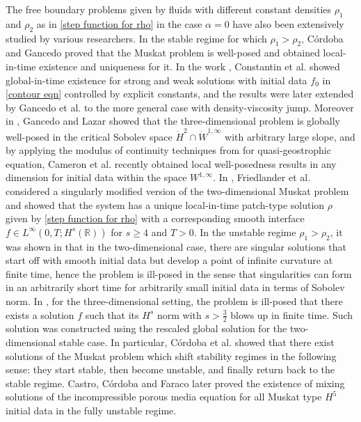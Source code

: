 \documentclass[reqno]{amsart}%
\theoremstyle{definition}
\theoremstyle{remark}
\numberwithin{equation}{section}
\newcommand{\0}{\mathbf{0}}
\newcommand{\1}{\mathbf{1}}
\newcommand{\R}{\mathbb R}
\numberwithin{equation}{section}
\numberwithin{theorem}{section}
\numberwithin{figure}{section}
\begin{document}
The free boundary problems given by fluids with different constant densities $\rho_1$ and $\rho_2$ as in \eqref{step function for rho} in the case $\alpha  = 0$ have also been extensively studied by various researchers. In the stable regime for which $\rho_1>\rho_2$, C\'ordoba and Gancedo \cite{CG07, cordoba2009maximum} proved that the Muskat problem is well-posed and obtained local-in-time existence and uniqueness for it. In the work \cite{constantin2016muskat}, Constantin et al. showed global-in-time existence for strong and weak solutions with initial data $f_0$ in \eqref{contour eqn} controlled by explicit constants, and the results were later extended by Gancedo et al. \cite{GGPS19} to the more general case with density-viscosity jump. Moreover in \cite{GL22}, Gancedo and Lazar showed that the three-dimensional problem is globally well-posed in the critical Sobolev space $\dot{H}^2\cap\dot{W}^{1,\infty}$ with arbitrary large slope, and by applying the modulus of continuity techniques from \cite{KNV07} for quasi-geostrophic equation, Cameron et al. \cite{CCH26} recently obtained local well-posedness results in any dimension for initial data within the space $W^{1,\infty}$. In \cite{FGSV12}, Friedlander et al. considered a singularly modified version of the two-dimensional Muskat problem and showed that the system has a unique local-in-time patch-type solution $\rho$ given by \eqref{step function for rho} with a corresponding smooth interface $f\in L^\infty(0,T;H^s(\R))$ for $s\ge4$ and $T>0$. In the unstable regime $\rho_1>\rho_2$, it was shown in \cite{SCH04} that in the two-dimensional case, there are singular solutions that start off with smooth initial data but develop a point of infinite curvature at finite time, hence the problem is ill-posed in the sense that singularities can form in
an arbitrarily short time for arbitrarily small initial data in terms of Sobolev norm. In \cite{CG07}, for the three-dimensional setting, the problem is ill-posed that there exists a solution $f$ such that its $H^s$ norm with $s>\frac{3}{2}$ blows up in finite time. Such solution was constructed using the rescaled global solution for the two-dimensional stable case. In particular, C\'ordoba et al. \cite{CGJ17} showed that there exist solutions of the Muskat problem which shift stability regimes in the following sense: they start stable, then become unstable, and finally return back to the stable regime. Castro, C\'ordoba and Faraco \cite{CCF21} later proved the existence of mixing solutions of the incompressible porous media equation for
all Muskat type $H^5$ initial data in the fully unstable regime.
\end{document}
